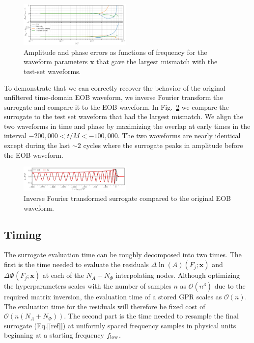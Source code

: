 \documentclass[prd,aps,letter,twocolumn,floatfix,notitlepage,nofootinbib]{revtex4-1}
\def\bx{\mathbf{x}}
\begin{document}
\begin{figure}[htb]
\centering
\includegraphics[width=0.49\textwidth]{htildemaxerror.png}
\caption{Amplitude and phase errors as functions of frequency for the waveform parameters $\bx$ that gave the largest mismatch with the test-set waveforms.}
\label{fig:maxmismatch}
\end{figure}

To demonstrate that we can correctly recover the behavior of the original unfiltered time-domain EOB waveform, we inverse Fourier transform the surrogate and compare it to the EOB waveform. In Fig.~\ref{fig:maxmismatchtd} we compare the surrogate to the test set waveform that had the largest mismatch. We align the two waveforms in time and phase by maximizing the overlap at early times in the interval $-200,000 < t/M < -100,000$. The two waveforms are nearly identical except during the last $\sim 2$ cycles where the surrogate peaks in amplitude before the EOB waveform.

\begin{figure}[htb]
\centering
\includegraphics[width=0.49\textwidth]{hmaxerror.png}
\caption{Inverse Fourier transformed surrogate compared to the original EOB waveform.}
\label{fig:maxmismatchtd}
\end{figure}


\subsection{Timing}

The surrogate evaluation time can be roughly decomposed into two times. The first is the time needed to evaluate the residuals $\Delta\ln(A)(F_j; \bx)$ and $\Delta\Phi(F_j; \bx)$ at each of the $N_A+N_\Phi$ interpolating nodes. Although optimizing the hyperparameters scales with the number of samples $n$ as $\mathcal{O}(n^3)$ due to the required matrix inversion, the evaluation time of a stored GPR scales as $\mathcal{O}(n)$. The evaluation time for the residuals will therefore be fixed cost of $\mathcal{O}(n(N_A+N_\Phi))$. The second part is the time needed to resample the final surrogate (Eq.[[ref]]) at uniformly spaced frequency samples in physical units beginning at a starting frequency $f_{\rm low}$.
\end{document}
